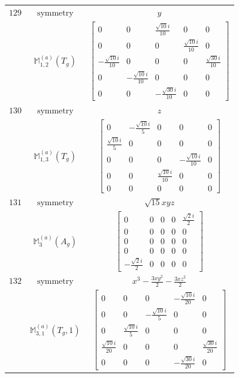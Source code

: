 \documentclass[fleqn,8pt,landscape]{jsarticle}
\begin{document}
\begin{longtable}{ccc}
$ 129 $ & $ \text{symmetry} $ & $ y $ \\
$  $ & $ \mathbb{M}_{1,2}^{(a)}(T_{g}) $ & $ \begin{bmatrix} 0 & 0 & \frac{\sqrt{10} i}{10} & 0 & 0 \\ 0 & 0 & 0 & \frac{\sqrt{10} i}{10} & 0 \\ - \frac{\sqrt{10} i}{10} & 0 & 0 & 0 & \frac{\sqrt{30} i}{10} \\ 0 & - \frac{\sqrt{10} i}{10} & 0 & 0 & 0 \\ 0 & 0 & - \frac{\sqrt{30} i}{10} & 0 & 0 \end{bmatrix} $ \\ \hline
$ 130 $ & $ \text{symmetry} $ & $ z $ \\
$  $ & $ \mathbb{M}_{1,3}^{(a)}(T_{g}) $ & $ \begin{bmatrix} 0 & - \frac{\sqrt{10} i}{5} & 0 & 0 & 0 \\ \frac{\sqrt{10} i}{5} & 0 & 0 & 0 & 0 \\ 0 & 0 & 0 & - \frac{\sqrt{10} i}{10} & 0 \\ 0 & 0 & \frac{\sqrt{10} i}{10} & 0 & 0 \\ 0 & 0 & 0 & 0 & 0 \end{bmatrix} $ \\ \hline
$ 131 $ & $ \text{symmetry} $ & $ \sqrt{15} x y z $ \\
$  $ & $ \mathbb{M}_{3}^{(a)}(A_{g}) $ & $ \begin{bmatrix} 0 & 0 & 0 & 0 & \frac{\sqrt{2} i}{2} \\ 0 & 0 & 0 & 0 & 0 \\ 0 & 0 & 0 & 0 & 0 \\ 0 & 0 & 0 & 0 & 0 \\ - \frac{\sqrt{2} i}{2} & 0 & 0 & 0 & 0 \end{bmatrix} $ \\ \hline
$ 132 $ & $ \text{symmetry} $ & $ x^{3} - \frac{3 x y^{2}}{2} - \frac{3 x z^{2}}{2} $ \\
$  $ & $ \mathbb{M}_{3,1}^{(a)}(T_{g},1) $ & $ \begin{bmatrix} 0 & 0 & 0 & - \frac{\sqrt{10} i}{20} & 0 \\ 0 & 0 & - \frac{\sqrt{10} i}{5} & 0 & 0 \\ 0 & \frac{\sqrt{10} i}{5} & 0 & 0 & 0 \\ \frac{\sqrt{10} i}{20} & 0 & 0 & 0 & \frac{\sqrt{30} i}{20} \\ 0 & 0 & 0 & - \frac{\sqrt{30} i}{20} & 0 \end{bmatrix} $ \\ \hline

\end{longtable}
\end{document}
